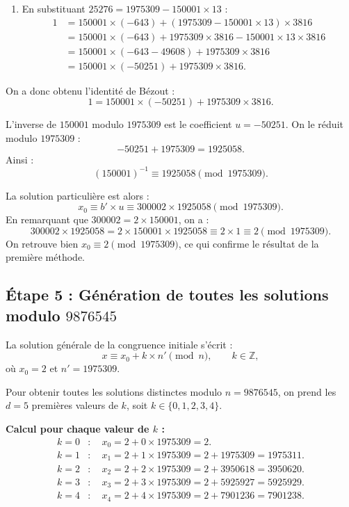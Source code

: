 \documentclass[12pt,a4paper]{article}
\begin{document}
\begin{enumerate}
\[\begin{aligned}
            &= 150001 \times (-643) + 25276 \times 3816.
          \end{aligned}
          \]
    \item En substituant $25276 = 1975309 - 150001 \times 13$ :
          \[
          \begin{aligned}
          1 &= 150001 \times (-643) + (1975309 - 150001 \times 13) \times 3816 \\
            &= 150001 \times (-643) + 1975309 \times 3816 - 150001 \times 13 \times 3816 \\
            &= 150001 \times (-643 - 49608) + 1975309 \times 3816 \\
            &= 150001 \times (-50251) + 1975309 \times 3816.
          \end{aligned}
          \]
\end{enumerate}

On a donc obtenu l'identité de Bézout :
\[
1 = 150001 \times (-50251) + 1975309 \times 3816.
\]

L'inverse de $150001$ modulo $1975309$ est le coefficient $u = -50251$. On le réduit modulo $1975309$ :
\[
-50251 + 1975309 = 1925058.
\]
Ainsi :
\[
\boxed{(150001)^{-1} \equiv 1925058 \pmod{1975309}}.
\]

La solution particulière est alors :
\[
x_0 \equiv b' \times u \equiv 300002 \times 1925058 \pmod{1975309}.
\]
En remarquant que $300002 = 2 \times 150001$, on a :
\[
300002 \times 1925058 = 2 \times 150001 \times 1925058 \equiv 2 \times 1 \equiv 2 \pmod{1975309}.
\]
On retrouve bien $x_0 \equiv 2 \pmod{1975309}$, ce qui confirme le résultat de la première méthode.

\subsection*{Étape 5 : Génération de toutes les solutions modulo $9876545$}

La solution générale de la congruence initiale s'écrit :
\[
x \equiv x_0 + k \times n' \pmod{n}, \qquad k \in \mathbb{Z},
\]
où $x_0 = 2$ et $n' = 1975309$.

Pour obtenir toutes les solutions distinctes modulo $n = 9876545$, on prend les $d = 5$ premières valeurs de $k$, soit $k \in \{0, 1, 2, 3, 4\}$.

\medskip
\textbf{Calcul pour chaque valeur de $k$ :}
\[
\begin{aligned}
k = 0 &: \quad x_0 = 2 + 0 \times 1975309 = 2. \\[6pt]
k = 1 &: \quad x_1 = 2 + 1 \times 1975309 = 2 + 1975309 = 1975311. \\[6pt]
k = 2 &: \quad x_2 = 2 + 2 \times 1975309 = 2 + 3950618 = 3950620. \\[6pt]
k = 3 &: \quad x_3 = 2 + 3 \times 1975309 = 2 + 5925927 = 5925929. \\[6pt]
k = 4 &: \quad x_4 = 2 + 4 \times 1975309 = 2 + 7901236 = 7901238.
\end{aligned}
\]
\end{document}
